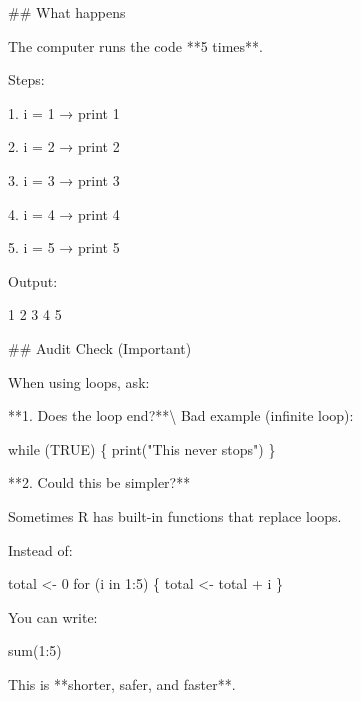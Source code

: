 \documentclass[
  letterpaper,
  DIV=11,
  numbers=noendperiod,
  oneside]{scrreprt}
\newenvironment{Shaded}{\begin{snugshade}}{\end{snugshade}}
\newcommand{\FunctionTok}[1]{\textcolor[rgb]{0.28,0.35,0.67}{#1}}
\newcommand{\InformationTok}[1]{\textcolor[rgb]{0.37,0.37,0.37}{#1}}
\newcommand{\NormalTok}[1]{\textcolor[rgb]{0.00,0.23,0.31}{#1}}
\newcommand{\SpecialStringTok}[1]{\textcolor[rgb]{0.13,0.47,0.30}{#1}}
\begin{document}
\begin{Shaded}
\begin{Highlighting}[numbers=left,,]
\FunctionTok{\#\# What happens}

\NormalTok{The computer runs the code **5 times**.}

\NormalTok{Steps:}

\SpecialStringTok{1.  }\InformationTok{\textasciigrave{}i = 1\textasciigrave{}}\NormalTok{ → print 1}

\SpecialStringTok{2.  }\InformationTok{\textasciigrave{}i = 2\textasciigrave{}}\NormalTok{ → print 2}

\SpecialStringTok{3.  }\InformationTok{\textasciigrave{}i = 3\textasciigrave{}}\NormalTok{ → print 3}

\SpecialStringTok{4.  }\InformationTok{\textasciigrave{}i = 4\textasciigrave{}}\NormalTok{ → print 4}

\SpecialStringTok{5.  }\InformationTok{\textasciigrave{}i = 5\textasciigrave{}}\NormalTok{ → print 5}

\NormalTok{Output:}

\InformationTok{\textasciigrave{}\textasciigrave{}\textasciigrave{}         }
\InformationTok{1 2 3 4 5}
\InformationTok{\textasciigrave{}\textasciigrave{}\textasciigrave{}}

\FunctionTok{\#\# Audit Check (Important)}

\NormalTok{When using loops, ask:}

\NormalTok{**1. Does the loop end?**\textbackslash{}}
\NormalTok{Bad example (infinite loop):}

\InformationTok{\textasciigrave{}\textasciigrave{}\textasciigrave{}         }
\InformationTok{while (TRUE) \{   print("This never stops") \}}
\InformationTok{\textasciigrave{}\textasciigrave{}\textasciigrave{}}

\NormalTok{**2. Could this be simpler?**}

\NormalTok{Sometimes R has built{-}in functions that replace loops.}

\NormalTok{Instead of:}

\InformationTok{\textasciigrave{}\textasciigrave{}\textasciigrave{}         }
\InformationTok{total \textless{}{-} 0 for (i in 1:5) \{   total \textless{}{-} total + i \}}
\InformationTok{\textasciigrave{}\textasciigrave{}\textasciigrave{}}

\NormalTok{You can write:}

\InformationTok{\textasciigrave{}\textasciigrave{}\textasciigrave{}         }
\InformationTok{sum(1:5)}
\InformationTok{\textasciigrave{}\textasciigrave{}\textasciigrave{}}

\NormalTok{This is **shorter, safer, and faster**.}



\end{Highlighting}
\end{Shaded}
\end{document}

